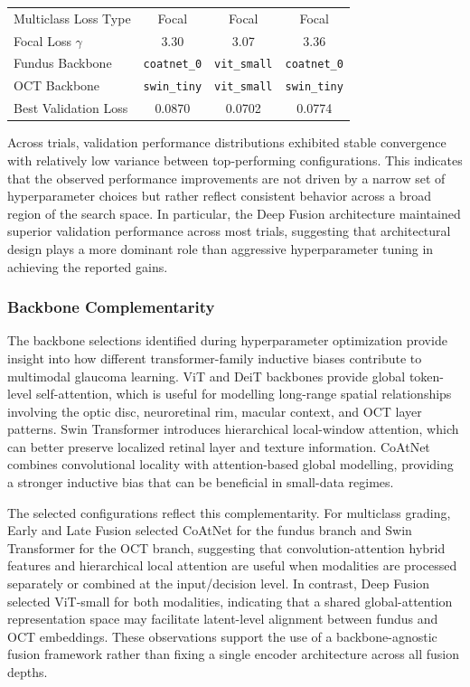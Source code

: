 \documentclass[preprint,12pt]{elsarticle}
\begin{document}
\begin{table}[htb]
\begin{tabular}{|l|c|c|c|}
        Multiclass Loss Type    & Focal                 & Focal                & Focal                \\
        Focal Loss $\gamma$     & 3.30                  & 3.07                 & 3.36                 \\
        Fundus Backbone         & \texttt{coatnet\_0}   & \texttt{vit\_small}  & \texttt{coatnet\_0}  \\
        OCT Backbone            & \texttt{swin\_tiny}   & \texttt{vit\_small}  & \texttt{swin\_tiny}  \\
        \hline
        Best Validation Loss    & 0.0870                & 0.0702               & 0.0774               \\
        \hline
    \end{tabular}
\end{table}

Across trials, validation performance distributions exhibited stable convergence with relatively low variance between top-performing configurations. This indicates that the observed performance improvements are not driven by a narrow set of hyperparameter choices but rather reflect consistent behavior across a broad region of the search space. In particular, the Deep Fusion architecture maintained superior validation performance across most trials, suggesting that architectural design plays a more dominant role than aggressive hyperparameter tuning in achieving the reported gains.

\subsubsection{Backbone Complementarity}
\label{subsec:backbone_complementarity}

The backbone selections identified during hyperparameter optimization provide insight into how different transformer-family inductive biases contribute to multimodal glaucoma learning. ViT and DeiT backbones provide global token-level self-attention, which is useful for modelling long-range spatial relationships involving the optic disc, neuroretinal rim, macular context, and OCT layer patterns. Swin Transformer introduces hierarchical local-window attention, which can better preserve localized retinal layer and texture information. CoAtNet combines convolutional locality with attention-based global modelling, providing a stronger inductive bias that can be beneficial in small-data regimes.

The selected configurations reflect this complementarity. For multiclass grading, Early and Late Fusion selected CoAtNet for the fundus branch and Swin Transformer for the OCT branch, suggesting that convolution-attention hybrid features and hierarchical local attention are useful when modalities are processed separately or combined at the input/decision level. In contrast, Deep Fusion selected ViT-small for both modalities, indicating that a shared global-attention representation space may facilitate latent-level alignment between fundus and OCT embeddings. These observations support the use of a backbone-agnostic fusion framework rather than fixing a single encoder architecture across all fusion depths.
\end{document}
